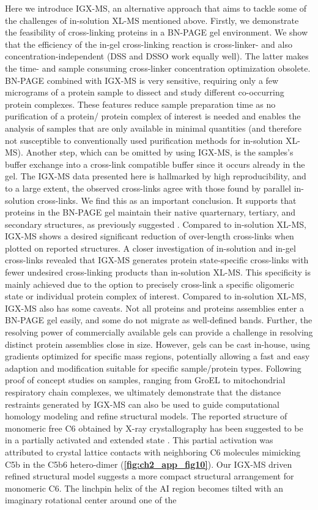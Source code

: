 Here we introduce IGX-MS, an alternative approach that aims to tackle some of the challenges of in-solution XL-MS mentioned above. Firstly, we demonstrate the feasibility of cross-linking proteins in a BN-PAGE gel environment. We show that the efficiency of the in-gel cross-linking reaction is cross-linker- and also concentration-independent (DSS and DSSO work equally well). The latter makes the time- and sample consuming cross-linker concentration optimization obsolete. BN-PAGE combined with IGX-MS is very sensitive, requiring only a few micrograms of a protein sample to dissect and study different co-occurring protein complexes. These features reduce sample preparation time as no purification of a protein/ protein complex of interest is needed and enables the analysis of samples that are only available in minimal quantities (and therefore not susceptible to conventionally used purification methods for in-solution XL-MS). Another step, which can be omitted by using IGX-MS, is the samples's buffer exchange into a cross-link compatible buffer since it occurs already in the gel. The IGX-MS data presented here is hallmarked by high reproducibility, and to a large extent, the observed cross-links agree with those found by parallel in-solution cross-links. We find this as an important conclusion. It supports that proteins in the BN-PAGE gel maintain their native quarternary, tertiary, and secondary structures, as previously suggested \cite{Poetsch_2000, Schafer_2006, Wittig_2007}. Compared to in-solution XL-MS, IGX-MS shows a desired significant reduction of over-length cross-links when plotted on reported structures. A closer investigation of in-solution and in-gel cross-links revealed that IGX-MS generates protein state-specific cross-links with fewer undesired cross-linking products than in-solution XL-MS. This specificity is mainly achieved due to the option to precisely cross-link a specific oligomeric state or individual protein complex of interest. Compared to in-solution XL-MS, IGX-MS also has some caveats. Not all proteins and proteins assemblies enter a BN-PAGE gel easily, and some do not migrate as well-defined bands. Further, the resolving power of commercially available gels can provide a challenge in resolving distinct protein assemblies close in size. However, gels can be cast in-house, using gradients optimized for specific mass regions, potentially allowing a fast and easy adaption and modification suitable for specific sample/protein types. Following proof of concept studies on samples, ranging from GroEL to mitochondrial respiratory chain complexes, we ultimately demonstrate that the distance restraints generated by IGX-MS can also be used to guide computational homology modeling and refine structural models. The reported structure of monomeric free C6 obtained by X-ray crystallography has been suggested to be in a partially activated and extended state \cite{Aleshin_2012}. This partial activation was attributed to crystal lattice contacts with neighboring C6 molecules mimicking C5b in the C5b6 hetero-dimer (\textbf{\autoref{fig:ch2_app_fig10}}). Our IGX-MS driven refined structural model suggests a more compact structural arrangement for monomeric C6. The linchpin helix of the AI region becomes tilted with an imaginary rotational center around one of the 